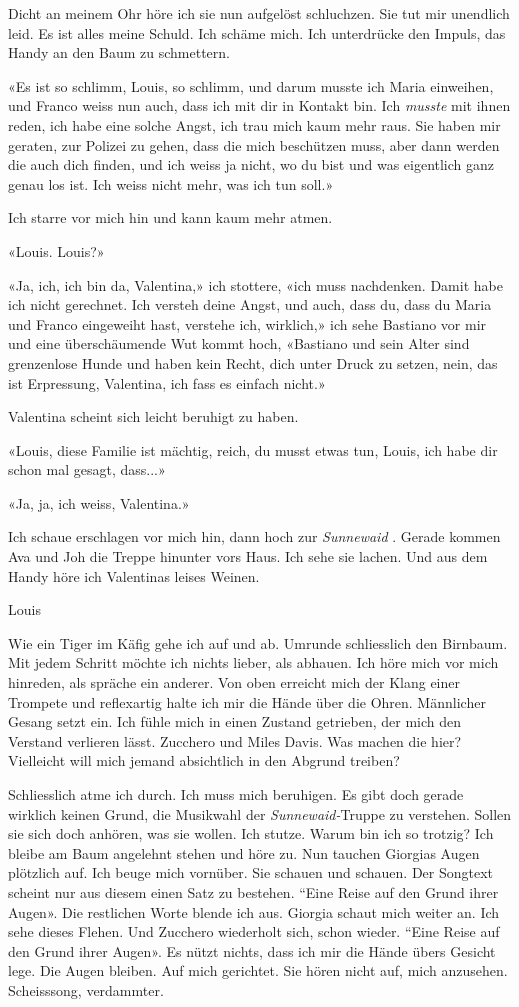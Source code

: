 Dicht an meinem Ohr höre ich sie nun aufgelöst schluchzen. Sie tut mir
unendlich leid. Es ist alles meine Schuld. Ich schäme mich. Ich
unterdrücke den Impuls, das Handy an den Baum zu schmettern.

«Es ist so schlimm, Louis, so schlimm, und darum musste ich Maria
einweihen, und Franco weiss nun auch, dass ich mit dir in Kontakt bin.
Ich \emph{musste} mit ihnen reden, ich habe eine solche Angst, ich trau
mich kaum mehr raus. Sie haben mir geraten, zur Polizei zu gehen, dass
die mich beschützen muss, aber dann werden die auch dich finden, und ich
weiss ja nicht, wo du bist und was eigentlich ganz genau los ist. Ich
weiss nicht mehr, was ich tun soll.»

Ich starre vor mich hin und kann kaum mehr atmen.

«Louis. Louis?»

«Ja, ich, ich bin da, Valentina,» ich stottere, «ich muss nachdenken.
Damit habe ich nicht gerechnet. Ich versteh deine Angst, und auch, dass
du, dass du Maria und Franco eingeweiht hast, verstehe ich, wirklich,»
ich sehe Bastiano vor mir und eine überschäumende Wut kommt hoch,
«Bastiano und sein Alter sind grenzenlose Hunde und haben kein Recht,
dich unter Druck zu setzen, nein, das ist Erpressung, Valentina, ich
fass es einfach nicht.»

Valentina scheint sich leicht beruhigt zu haben.

«Louis, diese Familie ist mächtig, reich, du musst etwas tun, Louis, ich
habe dir schon mal gesagt, dass...»

«Ja, ja, ich weiss, Valentina.»

Ich schaue erschlagen vor mich hin, dann hoch zur \emph{Sunnewaid} .
Gerade kommen Ava und Joh die Treppe hinunter vors Haus. Ich sehe sie
lachen. Und aus dem Handy höre ich Valentinas leises Weinen.

Louis

Wie ein Tiger im Käfig gehe ich auf und ab. Umrunde schliesslich den
Birnbaum. Mit jedem Schritt möchte ich nichts lieber, als abhauen. Ich
höre mich vor mich hinreden, als spräche ein anderer. Von oben erreicht
mich der Klang einer Trompete und reflexartig halte ich mir die Hände
über die Ohren. Männlicher Gesang setzt ein. Ich fühle mich in einen
Zustand getrieben, der mich den Verstand verlieren lässt. Zucchero und
Miles Davis. Was machen die hier? Vielleicht will mich jemand
absichtlich in den Abgrund treiben?

Schliesslich atme ich durch. Ich muss mich beruhigen. Es gibt doch
gerade wirklich keinen Grund, die Musikwahl der \emph{Sunnewaid-}Truppe
zu verstehen. Sollen sie sich doch anhören, was sie wollen. Ich stutze.
Warum bin ich so trotzig? Ich bleibe am Baum angelehnt stehen und höre
zu. Nun tauchen Giorgias Augen plötzlich auf. Ich beuge mich vornüber.
Sie schauen und schauen. Der Songtext scheint nur aus diesem einen Satz
zu bestehen. ``Eine Reise auf den Grund ihrer Augen». Die restlichen
Worte blende ich aus. Giorgia schaut mich weiter an. Ich sehe dieses
Flehen. Und Zucchero wiederholt sich, schon wieder. ``Eine Reise auf den
Grund ihrer Augen». Es nützt nichts, dass ich mir die Hände übers
Gesicht lege. Die Augen bleiben. Auf mich gerichtet. Sie hören nicht
auf, mich anzusehen. Scheisssong, verdammter.

